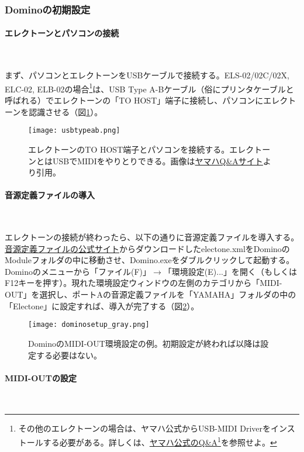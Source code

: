\documentclass[uplatex, 10pt, dvipdfmx]{jsarticle}
\numberwithin{equation}{section}
\begin{document}
\subsubsection{Dominoの初期設定}
\paragraph{エレクトーンとパソコンの接続}\

まず、パソコンとエレクトーンをUSBケーブルで接続する。ELS-02/02C/02X, ELC-02, ELB-02の場合\footnote{その他のエレクトーンの場合は、ヤマハ公式からUSB-MIDI Driverをインストールする必要がある。詳しくは、\href{https://yamaha.custhelp.com/app/answers/detail/a_id/10045/}{ヤマハ公式のQ\&A}\footnote{\url{https://yamaha.custhelp.com/app/answers/detail/a_id/10045/}}を参照せよ。}は、USB Type A-Bケーブル（俗にプリンタケーブルと呼ばれる）でエレクトーンの「TO HOST」端子に接続し、パソコンにエレクトーンを認識させる（図\ref{figELUSB}）。

\begin{figure}[h]
  \centering
  \texttt{[image: usbtypeab.png]}
  \caption{エレクトーンのTO HOST端子とパソコンを接続する。エレクトーンとはUSBでMIDIをやりとりできる。画像は\href{https://yamaha.custhelp.com/app/answers/detail/a_id/1316/related/1}{ヤマハQ\&Aサイト}より引用。}
  \label{figELUSB}
\end{figure}

\paragraph{音源定義ファイルの導入}\

エレクトーンの接続が終わったら、以下の通りに音源定義ファイルを導入する。\href{https://www.kamekyame.com/el/domino-define}{音源定義ファイルの公式サイト}からダウンロードしたelectone.xmlをDominoのModuleフォルダの中に移動させ、Domino.exeをダブルクリックして起動する。Dominoのメニューから「ファイル(F)」$\rightarrow$「環境設定(E)...」を開く（もしくはF12キーを押す）。現れた環境設定ウィンドウの左側のカテゴリから「MIDI-OUT」を選択し、ポートAの音源定義ファイルを「YAMAHA」フォルダの中の「Electone」に設定すれば、導入が完了する（図\ref{figDominoSetup}）。

\begin{figure}[h]
  \centering
  \texttt{[image: dominosetup\_gray.png]}
  \caption{DominoのMIDI-OUT環境設定の例。初期設定が終われば以降は設定する必要はない。}
  \label{figDominoSetup}
\end{figure}

\paragraph{MIDI-OUTの設定}\
\end{document}

